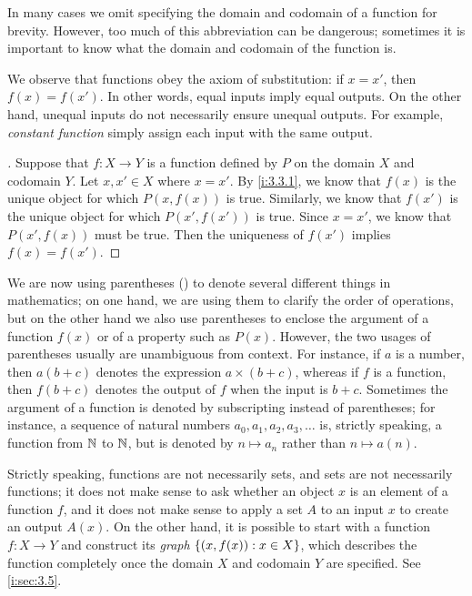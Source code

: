 \begin{note}
  In many cases we omit specifying the domain and codomain of a function for brevity.
  However, too much of this abbreviation can be dangerous;
  sometimes it is important to know what the domain and codomain of the function is.
\end{note}

\begin{ac}\label{i:ac:3.3.1}
  We observe that functions obey the axiom of substitution:
  if \(x = x'\), then \(f(x) = f(x')\).
  In other words, equal inputs imply equal outputs.
  On the other hand, unequal inputs do not necessarily ensure unequal outputs.
  For example, \emph{constant function} simply assign each input with the same output.
\end{ac}

\begin{proof}[]
  Suppose that \(f : X \to Y\) is a function defined by \(P\) on the domain \(X\) and codomain \(Y\).
  Let \(x, x' \in X\) where \(x = x'\).
  By \cref{i:3.3.1}, we know that \(f(x)\) is the unique object for which \(P(x, f(x))\) is true.
  Similarly, we know that \(f(x')\) is the unique object for which \(P(x', f(x'))\) is true.
  Since \(x = x'\), we know that \(P(x', f(x))\) must be true.
  Then the uniqueness of \(f(x')\) implies \(f(x) = f(x')\).
\end{proof}

\setcounter{thm}{4}
\begin{rmk}\label{i:3.3.5}
  We are now using parentheses () to denote several different things in mathematics;
  on one hand, we are using them to clarify the order of operations, but on the other hand we also use parentheses to enclose the argument of a function \(f(x)\) or of a property such as \(P(x)\).
  However, the two usages of parentheses usually are unambiguous from context.
  For instance, if \(a\) is a number, then \(a(b + c)\) denotes the expression \(a \times (b + c)\), whereas if \(f\) is a function, then \(f(b + c)\) denotes the output of \(f\) when the input is \(b + c\).
  Sometimes the argument of a function is denoted by subscripting instead of parentheses;
  for instance, a sequence of natural numbers \(a_0, a_1, a_2, a_3, \dots\) is, strictly speaking, a function from \(\mathbb{N}\) to \(\mathbb{N}\), but is denoted by \(n \mapsto a_n\) rather than \(n \mapsto a(n)\).
\end{rmk}

\begin{rmk}\label{i:3.3.6}
  Strictly speaking, functions are not necessarily sets, and sets are not necessarily functions;
  it does not make sense to ask whether an object \(x\) is an element of a function \(f\), and it does not make sense to apply a set \(A\) to an input \(x\) to create an output \(A(x)\).
  On the other hand, it is possible to start with a function \(f : X \to Y\) and construct its \emph{graph} \(\left\lbrace(x, f(x)) : x \in X\right\rbrace\), which describes the function completely once the domain \(X\) and codomain \(Y\) are specified.
  See \cref{i:sec:3.5}.
\end{rmk}

